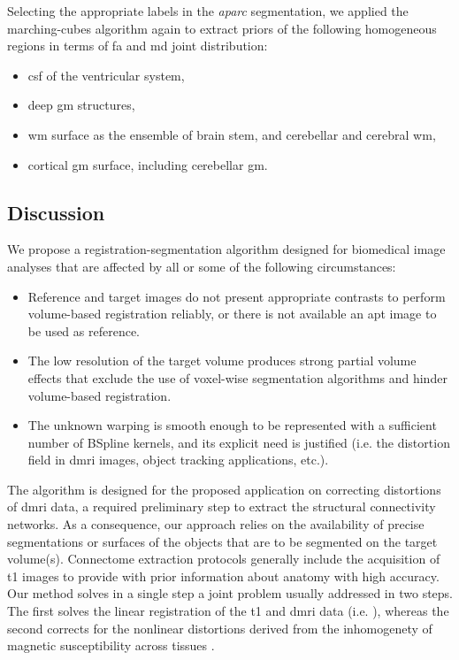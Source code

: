 Selecting the appropriate labels in the \emph{aparc} segmentation, we applied
  the marching-cubes algorithm again to extract priors of the following
  homogeneous regions in terms of \gls*{fa} and \gls*{md} joint distribution:
\begin{itemize}
	\item \gls*{csf} of the ventricular system,
	\item deep \gls*{gm} structures,
	\item \gls*{wm} surface as the ensemble of brain stem, and
	  cerebellar and cerebral \gls*{wm},
	\item cortical \gls*{gm} surface, including cerebellar \gls*{gm}.
\end{itemize}

\subsection{Discussion}
\label{sec:discussion}
We propose a registration-segmentation algorithm designed for biomedical
  image analyses that are affected by all or some of the following circumstances:
  \begin{itemize}
  	\item Reference and target images do not present appropriate contrasts to
  	perform volume-based registration reliably, or there is not available an apt image
 		to be used as reference.
  	\item The low resolution of the target volume produces strong partial volume effects
  	that exclude the use of voxel-wise segmentation algorithms and hinder volume-based
  	registration.
  	\item The unknown warping is smooth enough to be represented with a sufficient number
  	of BSpline kernels, and its explicit need is justified (i.e. the distortion
  	field in \gls*{dmri} images, object tracking applications, etc.).
  \end{itemize}
The algorithm is designed for the proposed application on correcting distortions of
  \gls*{dmri} data, a required preliminary step to extract the structural connectivity
  networks.
As a consequence, our approach relies on the availability of precise segmentations or
  surfaces of the objects that are to be segmented on the target volume(s).
Connectome extraction protocols generally include the acquisition of \gls*{t1} images
  to provide with prior information about anatomy with high accuracy.
Our method solves in a single step a joint problem usually addressed in two steps.
The first solves the linear registration of the \gls*{t1} and \gls*{dmri} data (i.e.
  \cite{greve_accurate_2009}), whereas the second corrects for the nonlinear distortions
  derived from the inhomogenety of magnetic susceptibility across tissues
  \citep{jezzard_correction_1995}.

